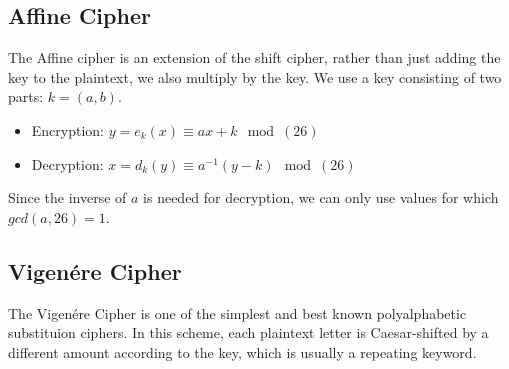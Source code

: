 \documentclass{math}
\begin{document}
\subsection*{Affine Cipher}
The Affine cipher is an extension of the shift cipher, rather than just adding
the key to the plaintext, we also multiply by the key. We use a key consisting
of two parts: \( k = (a,b) \).
\begin{itemize}
  \item Encryption: \( y = e_k(x) \equiv ax+k\mod(26) \)
  \item Decryption: \( x = d_k(y) \equiv a^{-1}(y-k)\mod(26) \)
\end{itemize}
Since the inverse of \( a \) is needed for decryption, we can only use values
for which \( gcd(a,26) = 1 \).

\subsection*{Vigen\'{e}re Cipher}
The Vigen\'{e}re Cipher is one of the simplest and best known polyalphabetic
substituion ciphers. In this scheme, each plaintext letter is Caesar-shifted
by a different amount according to the key, which is usually a repeating
keyword.
\end{document}

